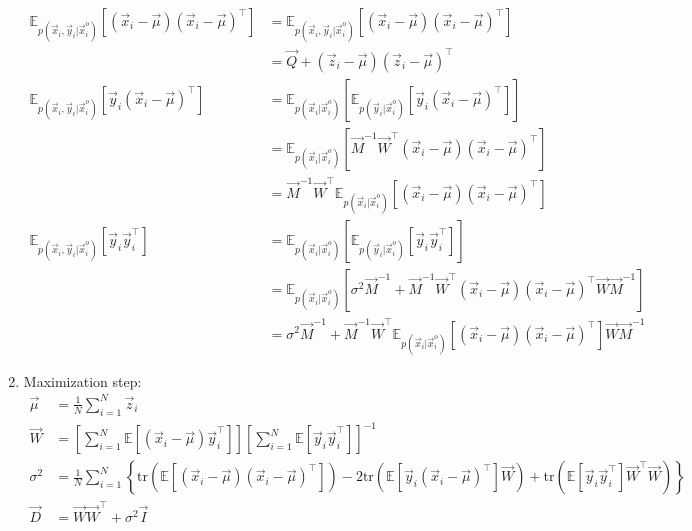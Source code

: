 \documentclass[12pt,twoside]{article}
\begin{document}
\begin{enumerate}
		\begin{align*}
			\mathbb{E}_{p(\vec{x}_i,\vec{y}_i\vert \vec{x}_i^o)}[(\vec{x}_i-\vec{\mu})(\vec{x}_i-\vec{\mu})^\top] 
			&=\mathbb{E}_{p(\vec{x}_i,\vec{y}_i\vert \vec{x}_i^o)}[(\vec{x}_i-\vec{\mu})(\vec{x}_i-\vec{\mu})^\top]\\ 
			&=\vec{Q}+(\vec{z}_i-\vec{\mu})(\vec{z}_i-\vec{\mu})^\top\\ 			
			\mathbb{E}_{p(\vec{x}_i,\vec{y}_i\vert \vec{x}_i^o)}[\vec{y}_i(\vec{x}_i-\vec{\mu})^\top] 
			&=\mathbb{E}_{p(\vec{x}_i\vert \vec{x}_i^o)}\left[\mathbb{E}_{p(\vec{y}_i\vert \vec{x}_i^o)} \left[\vec{y}_i(\vec{x}_i-\vec{\mu})^\top\right]\right] \\
			&=\mathbb{E}_{p(\vec{x}_i\vert \vec{x}_i^o)}\left[\vec{M}^{-1}\vec{W}^\top (\vec{x}_i-\vec{\mu})(\vec{x}_i-\vec{\mu})^\top\right]\\
			& =\vec{M}^{-1}\vec{W}^\top \mathbb{E}_{p(\vec{x}_i\vert \vec{x}_i^o)}\left[(\vec{x}_i-\vec{\mu})(\vec{x}_i-\vec{\mu})^\top\right]\\
			\mathbb{E}_{p(\vec{x}_i,\vec{y}_i\vert \vec{x}_i^o)}[\vec{y}_i\vec{y}_i^\top] 
			&=\mathbb{E}_{p(\vec{x}_i\vert \vec{x}_i^o)}\left[\mathbb{E}_{p(\vec{y}_i\vert \vec{x}_i^o)} \left[\vec{y}_i\vec{y}_i^\top\right]\right] \\
			&=\mathbb{E}_{p(\vec{x}_i\vert \vec{x}_i^o)}\left[\sigma^2 \vec{M}^{-1}+\vec{M}^{-1}\vec{W}^\top (\vec{x}_i-\vec{\mu})(\vec{x}_i-\vec{\mu})^\top\vec{W}\vec{M}^{-1}\right]\\
			& =\sigma^2\vec{M}^{-1}+ \vec{M}^{-1}\vec{W}^\top\mathbb{E}_{p(\vec{x}_i\vert \vec{x}_i^o)}\left[(\vec{x}_i-\vec{\mu})(\vec{x}_i-\vec{\mu})^\top\right] \vec{W} \vec{M}^{-1}
		\end{align*}

	\item Maximization step:
		\begin{align*}
				\vec{\mu}	&=\frac{1}{N}\sum_{i=1}^N \vec{z}_i\\
				\vec{W}	&=\left[\sum_{i=1}^N\mathbb{E}\left[(\vec{x}_i-\vec{\mu})\vec{y}_i^\top\right]\right]\left[\sum_{i=1}^N\mathbb{E}\left[\vec{y}_i\vec{y}_i^\top\right]\right]^{-1}\\
				\sigma^2 &=\frac{1}{N}\sum_{i=1}^N\left\lbrace \text{tr}\left(\mathbb{E}\left[(\vec{x}_i-\vec{\mu})(\vec{x}_i-\vec{\mu})^\top\right]\right) 
				-2 \text{tr}\left( \mathbb{E} \left[ \vec{y}_i (\vec{x}_i-\vec{\mu})^\top \right]\vec{W} \right)
				+ \text{tr}\left(\mathbb{E}\left[\vec{y}_i\vec{y}_i^\top\right]\vec{W}^\top\vec{W}\right)	
				\right\rbrace\\
				\vec{D} & = \vec{W}\vec{W}^\top +\sigma^2\vec{I}
		\end{align*}			
	

\end{enumerate}
\end{document}
